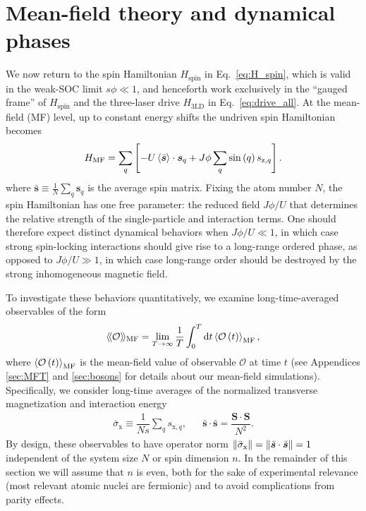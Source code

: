 \documentclass[nofootinbib,twocolumn]{revtex4-2}
\renewcommand{\t}{\text} %
\newcommand{\f}[2]{\dfrac{#1}{#2}} %
\newcommand{\p}[1]{\left(#1\right)} %
\renewcommand{\sp}[1]{\left[#1\right]} %
\newcommand{\bk}{\Braket} %
\renewcommand{\v}{\bm} %
\renewcommand{\c}{\cdot} %
\renewcommand{\dd}{\text{d}} %
\newcommand{\bbk}[1]{\langle\!\langle #1 \rangle\!\rangle}
\newcommand{\1}{\mathds{1}}
\newcommand{\x}{\text{x}}
\newcommand{\z}{\text{z}}
\renewcommand{\O}{\mathcal{O}}
\newcommand{\MF}{\text{MF}}
\renewcommand{\ss}{\bar{\v s}\c\bar{\v s}}
\begin{document}
\section{Mean-field theory and dynamical phases}
\label{sec:mean_field}

We now return to the spin Hamiltonian $H_{\t{spin}}$ in Eq.~\eqref{eq:H_spin}, which is valid in the weak-SOC limit $s\phi\ll1$, and henceforth work exclusively in the ``gauged frame'' of $H_{\t{spin}}$ and the three-laser drive $H_{\t{3LD}}$ in Eq.~\eqref{eq:drive_all}.
At the mean-field (MF) level, up to constant energy shifts the undriven spin Hamiltonian becomes
\begin{align}
  H_\MF = \sum_q\sp{-U\bk{\bar{\v s}}\c\v s_q
    + J\phi \sum_q \sin\p{q} s_{\z,q}}.
  \label{eq:H_MF}
\end{align}
where $\bar{\v s}\equiv\frac1N\sum_q\v s_q$ is the average spin matrix.
Fixing the atom number $N$, the spin Hamiltonian has one free parameter: the reduced field $J\phi/U$ that determines the relative strength of the single-particle and interaction terms.
One should therefore expect distinct dynamical behaviors when $J\phi/U\ll1$, in which case strong spin-locking interactions should give rise to a long-range ordered phase, as opposed to $J\phi/U\gg1$, in which case long-range order should be destroyed by the strong inhomogeneous magnetic field.

To investigate these behaviors quantitatively, we examine long-time-averaged observables of the form
\begin{align}
  \bbk{\O}_\MF = \lim_{T\to\infty} \f1T \int_0^T \dd t \bk{\O\p{t}}_\MF,
\end{align}
where $\bk{\O\p{t}}_\MF$ is the mean-field value of observable $\O$ at time $t$ (see Appendices \ref{sec:MFT} and \ref{sec:bosons} for details about our mean-field simulations).
Specifically, we consider long-time averages of the normalized transverse magnetization and interaction energy
\begin{align}
  \bar\sigma_\x \equiv \f1{Ns} \sum_q s_{\x,q},
  &&
  \ss = \f{\v S\c\v S}{N^2}.
\end{align}
By design, these observables to have operator norm $\norm{\bar\sigma_\x}=\norm{\ss}=1$ independent of the system size $N$ or spin dimension $n$.
In the remainder of this section we will assume that $n$ is even, both for the sake of experimental relevance (most relevant atomic nuclei are fermionic) and to avoid complications from parity effects.
\end{document}
